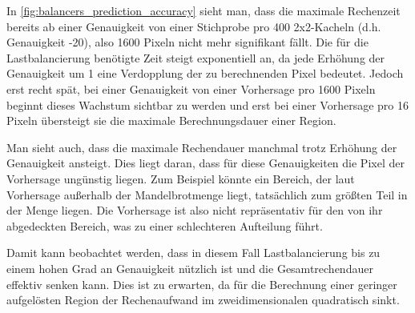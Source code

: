 In \autoref{fig:balancers_prediction_accuracy} sieht man, dass die maximale Rechenzeit bereits ab einer Genauigkeit von
einer Stichprobe pro 400 2x2-Kacheln (d.h. Genauigkeit -20), also 1600 Pixeln nicht mehr signifikant fällt.
Die für die Lastbalancierung benötigte Zeit steigt exponentiell an, da jede Erhöhung der Genauigkeit um 1 eine Verdopplung der zu berechnenden Pixel bedeutet.
Jedoch erst recht spät, bei einer Genauigkeit von einer Vorhersage pro 1600 Pixeln beginnt dieses Wachstum sichtbar zu werden
und erst bei einer Vorhersage pro 16 Pixeln übersteigt sie die maximale Berechnungsdauer einer Region.

Man sieht auch, dass die maximale Rechendauer manchmal trotz Erhöhung der Genauigkeit ansteigt.
Dies liegt daran, dass für diese Genauigkeiten die Pixel der Vorhersage ungünstig liegen.
Zum Beispiel könnte ein Bereich, der laut Vorhersage außerhalb der Mandelbrotmenge liegt, tatsächlich zum größten Teil in der Menge liegen.
Die Vorhersage ist also nicht repräsentativ für den von ihr abgedeckten Bereich, was zu einer schlechteren Aufteilung führt.

Damit kann beobachtet werden, dass in diesem Fall Lastbalancierung bis zu einem hohen Grad an Genauigkeit nützlich ist
und die Gesamtrechendauer effektiv senken kann.
Dies ist zu erwarten, da für die Berechnung einer geringer aufgelösten Region
der Rechenaufwand im zweidimensionalen quadratisch sinkt.

%
